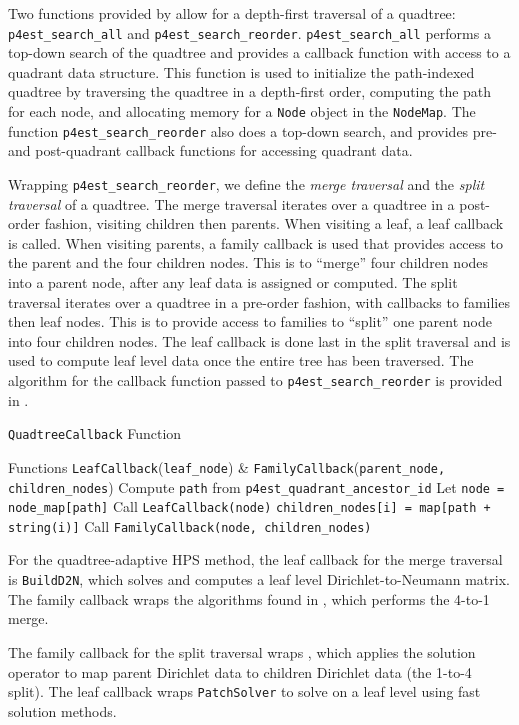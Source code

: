 Two functions provided by {\pforest} allow for a depth-first traversal of a {\pforest} quadtree: \texttt{p4est\_search\_all} and \texttt{p4est\_search\_reorder}. \texttt{p4est\_search\_all} performs a top-down search of the quadtree and provides a callback function with access to a {\pforest} quadrant data structure. This function is used to initialize the path-indexed quadtree by traversing the quadtree in a depth-first order, computing the path for each node, and allocating memory for a \texttt{Node} object in the \texttt{NodeMap}. The function \texttt{p4est\_search\_reorder} also does a top-down search, and provides pre- and post-quadrant callback functions for accessing quadrant data.

Wrapping \texttt{p4est\_search\_reorder}, we define the {\em merge traversal} and the {\em split traversal} of a quadtree. The merge traversal iterates over a quadtree in a post-order fashion, visiting children then parents. When visiting a leaf, a leaf callback is called. When visiting parents, a family callback is used that provides access to the parent and the four children nodes. This is to ``merge'' four children nodes into a parent node, after any leaf data is assigned or computed. The split traversal iterates over a quadtree in a pre-order fashion, with callbacks to families then leaf nodes. This is to provide access to families to ``split'' one parent node into four children nodes. The leaf callback is done last in the split traversal and is used to compute leaf level data once the entire tree has been traversed. The algorithm for the callback function passed to \texttt{p4est\_search\_reorder} is provided in .

\begin{algorithm}
\caption{\texttt{QuadtreeCallback} Function}
\begin{algorithmic}[0]
    \Require Functions \texttt{LeafCallback}(\texttt{leaf\_node}) \& \texttt{FamilyCallback}(\texttt{parent\_node, children\_nodes})
    \State Compute \texttt{path} from \texttt{p4est\_quadrant\_ancestor\_id}
    \State Let \texttt{node = node\_map[path]}
     
        \State Call \texttt{LeafCallback(node)}
    \Else {}
            \State \texttt{children\_nodes[i] = map[path + string(i)]}
        \EndFor
        \State Call \texttt{FamilyCallback(node, children\_nodes)}
    \EndIf
\end{algorithmic}
\label{alg:quadtree_callback}
\end{algorithm}

For the quadtree-adaptive HPS method, the leaf callback for the merge traversal is \texttt{BuildD2N}, which solves  and computes a leaf level Dirichlet-to-Neumann matrix. The family callback wraps the algorithms found in , which performs the 4-to-1 merge.

The family callback for the split traversal wraps , which applies the solution operator to map parent Dirichlet data to children Dirichlet data (the 1-to-4 split). The leaf callback wraps \texttt{PatchSolver} to solve  on a leaf level using fast solution methods.